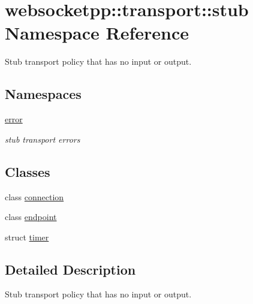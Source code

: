 \hypertarget{namespacewebsocketpp_1_1transport_1_1stub}{}\section{websocketpp\+:\+:transport\+:\+:stub Namespace Reference}
\label{namespacewebsocketpp_1_1transport_1_1stub}


Stub transport policy that has no input or output.  


\subsection*{Namespaces}
\begin{DoxyCompactItemize}
\item 
 \hyperlink{namespacewebsocketpp_1_1transport_1_1stub_1_1error}{error}
\begin{DoxyCompactList}\small\item\em stub transport errors \end{DoxyCompactList}\end{DoxyCompactItemize}
\subsection*{Classes}
\begin{DoxyCompactItemize}
\item 
class \hyperlink{classwebsocketpp_1_1transport_1_1stub_1_1connection}{connection}
\item 
class \hyperlink{classwebsocketpp_1_1transport_1_1stub_1_1endpoint}{endpoint}
\item 
struct \hyperlink{structwebsocketpp_1_1transport_1_1stub_1_1timer}{timer}
\end{DoxyCompactItemize}


\subsection{Detailed Description}
Stub transport policy that has no input or output. 